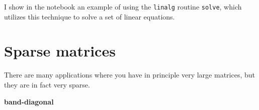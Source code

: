 I show in the notebook an example of using the {\tt linalg} routine
{\tt solve}, which utilizes this technique to solve a set of linear
equations. 

\section{Sparse matrices}

There are many applications where you have in principle very large
matrices, but they are in fact very sparse.  

{\bf band-diagonal}
